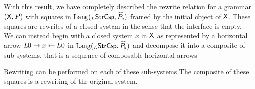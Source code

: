 \documentclass{amsart}
\begin{document}
With this result, we have completely described the
rewrite relation for a grammar $ ( \mathsf{X} , P ) $ with
squares in
$ \mathrm{Lang} ( _{L}\mathsf{StrCsp}, \widehat{P_\flat} ) $ framed by
the initial object of $ \mathsf{X} $.  These squares are
rewrites of a closed system in the sense that the
interface is empty.  We can instead begin with a
closed system $ x $ in $ \mathsf{X} $ as represented by a
horizontal arrow $ L0 \to x \leftarrow L0 $ in
$ \mathrm{Lang} ( _{L}\mathsf{StrCsp} , \widehat{P_\flat} ) $ and
decompose it into a composite of sub-systems, that
is a sequence of composable horizontal arrows


Rewriting can be performed on each of these sub-systems
 The composite of
these squares is a rewriting of the original system.










\end{document}
